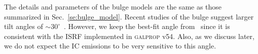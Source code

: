\documentclass[doublespace,nopageskip]{VTthesis}
\begin{document}
The details and parameters of the bulge models are the same as those summarized in Sec.~\ref{se:bulge_model}. Recent studies of the bulge suggest larger tilt angles of $\sim 30^\circ$~\cite{2013MNRAS.434..595C,2017MNRAS.465.1621P}. However, we keep the best-fit angle from~\citet{1998ApJ...492..495F} since it is consistent with the ISRF implemented in \textsc{galprop} v54. Also, as we discuss later, we do not expect the IC emissions to be very sensitive to this angle.



\end{document}
